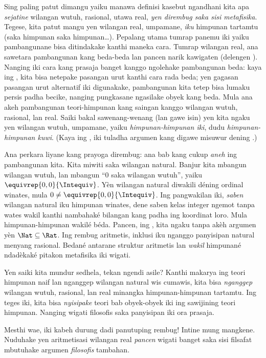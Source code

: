 \documentclass[../../../include/open-logic-section]{subfiles}
\begin{document}
Sing paling patut dimangu yaiku manawa definisi kasebut ngandhani kita apa
\emph{sejatine} wilangan wutuh, rasional, utawa real, \emph{yen dirembug
saka sisi metafisika}. Tegese, kita patut mangu yen wilangan real, umpamane,
\emph{iku} himpunan tartamtu (saka himpunan saka himpunan\ldots). Pepalang
utama tumrap panemu iki yaiku pambangunane bisa ditindakake kanthi maneka
cara. Tumrap wilangan real, ana sawetara pambangunan kang beda-beda lan pancen
narik kawigaten (delengen ). Nanging iki cara kang prasaja
banget kanggo ngolehake pambangunan beda: kaya ing
, kita bisa netepake pasangan urut kanthi cara
rada beda; yen gagasan pasangan urut alternatif iki digunakake,
pambangunan kita tetep bisa lumaku persis padha becike, nanging pungkasane
ngasilake obyek kang beda. Mula ana akeh pambangunan teori-himpunan kang
saingan kanggo wilangan wutuh, rasional, lan real. Saiki bakal sawenang-wenang
(lan gawe isin) yen kita ngaku yen wilangan wutuh, umpamane, yaiku
\emph{himpunan-himpunan iki}, dudu \emph{himpunan-himpunan kuwi}. (Kaya ing
, iki tuladha argumen kang digawe misuwur dening
\citealt{Benacerraf1965}.)

Ana perkara liyane kang prayoga dirembug: ana bab kang cukup \emph{aneh}
ing pambangunan kita. Kita miwiti saka wilangan natural. Banjur kita mbangun
wilangan wutuh, lan mbangun ``$0$ saka wilangan wutuh'', yaiku
$ \equivrep{0,0}{\Intequiv}$. Yèn wilangan natural diwakili déning ordinal winates, mula $0 \neq
\equivrep{0,0}{\Intequiv}$. Ing pangwakilan iki, \emph{saben}
wilangan natural iku himpunan winates, dene saben kelas integer
ngemot tanpa wates wakil kanthi nambahaké bilangan kang padha
ing koordinat loro. Mula himpunan-himpunan wakilé béda. Pancen, ing , kita ngaku tanpa
akèh argumen yèn $\Nat \subseteq \Rat$. Ing rembug aritmetis,
inklusi iku nganggo panyisipan natural menyang rasional. Bedané
antarane struktur aritmetis lan \emph{wakil} himpunané ndadèkaké
pitakon metafisika iki wigati.

Yen saiki kita mundur sedhela, tekan ngendi asile? Kanthi makarya ing teori
himpunan naif lan nganggep wilangan natural wis cumawis, kita bisa
\emph{nganggep} wilangan wutuh, rasional, lan real minangka himpunan-himpunan
tartamtu. Ing teges iki, kita bisa \emph{nyisipake} teori bab obyek-obyek iki
ing sawijining teori himpunan. Nanging wigati filosofis saka panyisipan iki
ora prasaja.

Mesthi wae, iki kabeh durung dadi panutuping rembug!{} Intine mung mangkene.
Nuduhake yen aritmetisasi wilangan real \emph{pancen} wigati banget saka
sisi filsafat mbutuhake argumen \emph{filosofis} tambahan.

\end{document}
